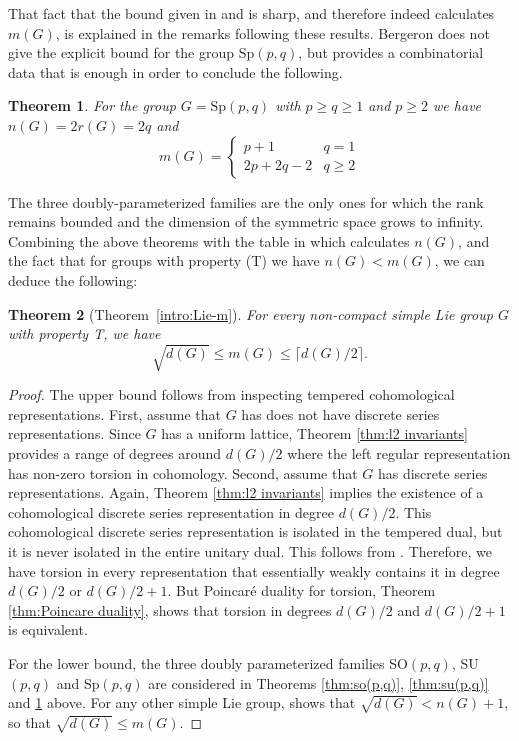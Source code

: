 \documentclass[12pt,reqno]{amsart}
\newtheorem{theorem}{Theorem}[section]
\theoremstyle{definition}
\begin{document}
That fact that the bound given in \cite[Corollary~4.3]{BergeronLefschetz} and \cite[Corollary~5.4.2]{BergeronClozel} is sharp, and therefore indeed calculates $m(G)$, is explained in the remarks following these results. Bergeron does not give the explicit bound for the group $\mathrm{Sp}(p,q)$, but \cite[Corollarie~2.3]{BergeronIsolation} provides a combinatorial data that is enough in order to conclude the following.
\begin{theorem}\label{thm:sp(p,q)}
    For the group $G=\mathrm{Sp}(p,q)$ with $p\geq q \geq 1$ and $p \geq 2$ we have $n(G)=2r(G)=2q$ and
    \[ m(G)= \begin{cases}
p+1 & q=1 \\
 2p+2q-2 & q \geq 2
\end{cases}\]
\end{theorem}
The three doubly-parameterized families are the only ones for which the rank remains bounded and the dimension of the symmetric space grows to infinity. Combining the above theorems with the table in \cite[Appendix A]{BaderSauer} which calculates $n(G)$, and the fact that for groups with property (T) we have $n(G)<m(G)$, we can deduce the following:
\begin{theorem}[Theorem~\ref{intro:Lie-m}]\label{thm:lie-m}
    For every non-compact simple Lie group $G$ with property T,
    we have 
    \[ \sqrt{d(G)} \leq m(G) \leq \lceil d(G)/2 \rceil. \]
\end{theorem}
\begin{proof}
    The upper bound follows from inspecting tempered cohomological representations. First, assume that $G$ has does not have discrete series representations. Since $G$ has a uniform lattice,  Theorem \ref{thm:l2 invariants} provides a range of degrees around $d(G)/2$ where the left regular representation has non-zero torsion in cohomology. Second, assume that $G$ has discrete series representations. Again, Theorem \ref{thm:l2 invariants} implies the existence of a cohomological discrete series representation in degree $d(G) / 2$. This cohomological discrete series representation is isolated in the tempered dual, but it is never isolated in the entire unitary dual. This follows from \cite[Remark 2 on p.10]{BergeronIsolation}. Therefore, we have torsion in every representation that essentially weakly contains it in degree $d(G) / 2$ or $d(G) / 2 + 1$. But Poincar\'e duality for torsion, Theorem \ref{thm:Poincare duality}, shows that torsion in degrees $d(G) / 2$ and $d(G) / 2 + 1$ is equivalent. 

    For the lower bound, the three doubly parameterized families SO$(p,q)$,  SU$(p,q)$ and Sp$(p,q)$ are considered in Theorems \ref{thm:so(p,q)}, \ref{thm:su(p,q)} and \ref{thm:sp(p,q)} above. For any other simple Lie group, \cite[Appendix A]{BaderSauer} shows that $\sqrt{d(G)}< n(G) + 1$, so that $\sqrt{d(G)} \leq m(G)$. 
\end{proof}
\end{document}
